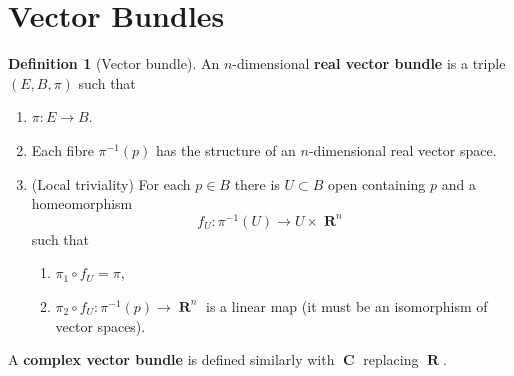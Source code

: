 \documentclass[10pt,]{book}
\newcommand{\terminology}[1]{\textbf{#1}}
\theoremstyle{plain}
\theoremstyle{definition}
\newtheorem{definition}[theorem]{Definition}
\numberwithin{equation}{section}
\DeclareMathOperator{\CC}{\mathbf{C}}
\DeclareMathOperator{\RR}{\mathbf{R}}
\begin{document}
\section[Vector Bundles]{Vector Bundles}\label{sec-vector-bundles}
\begin{definition}[Vector bundle]\label{definition-28}
An \(n\)-dimensional \terminology{real vector bundle} is a triple \((E,B,\pi)\) such that
            \begin{enumerate}
\item{}\(\pi \colon E \to B\).\item{}Each fibre \(\pi^{-1}(p)\) has the structure of an \(n\)-dimensional real vector space.\item{}(Local triviality) For each \(p \in B\) there is \(U \subset B\) open containing \(p\) and a homeomorphism
                \[f_U\colon \pi^{-1}(U) \to U \times \RR^n\]
                such that
                \begin{enumerate}
\item{}\(\pi_1\circ f_U = \pi\),\item{}\(\pi_2 \circ f_U\colon \pi^{-1}(p) \to \RR^n\) is a linear map (it must be an isomorphism of vector spaces).\end{enumerate}

              \end{enumerate}

            A \terminology{complex vector bundle} is defined similarly with \(\CC\) replacing \(\RR\).
          \end{definition}
\typeout{************************************************}
\typeout{************************************************}
\end{document}
